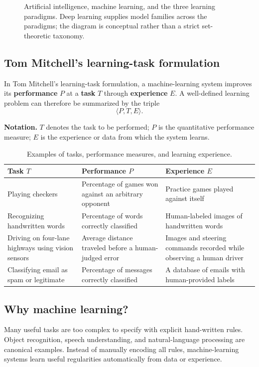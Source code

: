 \documentclass[11pt,a4paper]{article}
\newenvironment{formulabox}{\par\smallskip\begingroup\small\noindent\textbf{\color{MidGray}Notation.}\enspace}{\par\endgroup\smallskip}
\begin{document}
\begin{figure}[htbp]
\centering\hierarchydiagram
\caption{Artificial intelligence, machine learning, and the three learning paradigms. Deep learning supplies model families across the paradigms; the diagram is conceptual rather than a strict set-theoretic taxonomy.}
\end{figure}

\subsection{Tom Mitchell's learning-task formulation}
In Tom Mitchell's learning-task formulation, a machine-learning system improves its \textbf{performance} $P$ at a \textbf{task} $T$ through \textbf{experience} $E$. A well-defined learning problem can therefore be summarized by the triple
\[
\langle P,T,E\rangle.
\]

\begin{formulabox}
$T$ denotes the task to be performed; $P$ is the quantitative performance measure; $E$ is the experience or data from which the system learns.
\end{formulabox}

\begin{table}[htbp]
\centering
\caption{Examples of tasks, performance measures, and learning experience.}
\small
\begin{tabularx}{\textwidth}{@{}>{\raggedright\arraybackslash}p{}YY@{}}
\toprule
\textbf{Task $T$} & \textbf{Performance $P$} & \textbf{Experience $E$}\\
\midrule
Playing checkers & Percentage of games won against an arbitrary opponent & Practice games played against itself\\
Recognizing handwritten words & Percentage of words correctly classified & Human-labeled images of handwritten words\\
Driving on four-lane highways using vision sensors & Average distance traveled before a human-judged error & Images and steering commands recorded while observing a human driver\\
Classifying email as spam or legitimate & Percentage of messages correctly classified & A database of emails with human-provided labels\\
\bottomrule
\end{tabularx}
\end{table}

\subsection{Why machine learning?}
Many useful tasks are too complex to specify with explicit hand-written rules. Object recognition, speech understanding, and natural-language processing are canonical examples. Instead of manually encoding all rules, machine-learning systems learn useful regularities automatically from data or experience.
\end{document}

